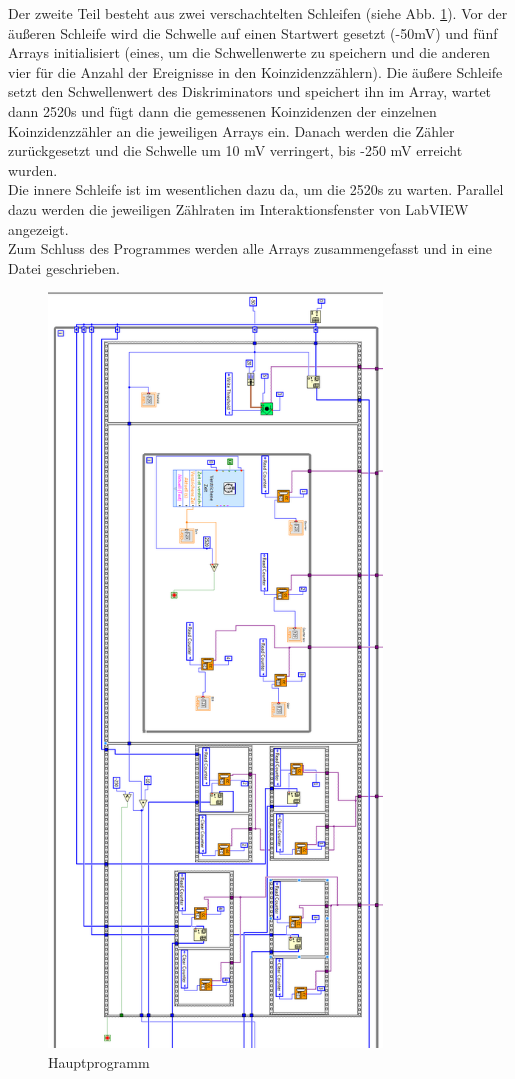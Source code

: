Der zweite Teil besteht aus zwei verschachtelten Schleifen (siehe Abb. \ref{fig:prog_prog}). Vor der äußeren Schleife wird die Schwelle auf einen Startwert gesetzt (-50\si{\milli\volt}) und fünf Arrays initialisiert (eines, um die Schwellenwerte zu speichern und die anderen vier für die Anzahl der Ereignisse in den Koinzidenzzählern). Die äußere Schleife setzt den Schwellenwert des Diskriminators und speichert ihn im Array, wartet dann 2520\si{\second} und fügt dann die gemessenen Koinzidenzen der einzelnen Koinzidenzzähler an die jeweiligen Arrays ein. Danach werden die Zähler zurückgesetzt und die Schwelle um 10 \si{\milli\volt} verringert, bis -250 \si{\milli\volt} erreicht wurden.\\
Die innere Schleife ist im wesentlichen dazu da, um die 2520\si{\second} zu warten. Parallel dazu werden die jeweiligen Zählraten im Interaktionsfenster von LabVIEW angezeigt.\\
Zum Schluss des Programmes werden alle Arrays zusammengefasst und in eine Datei geschrieben.

\begin{figure}
\centering
\includegraphics[height=20cm]{data/friedrich/prog_prog_rot.png}
\caption{Hauptprogramm}
\label{fig:prog_prog}
\end{figure}
